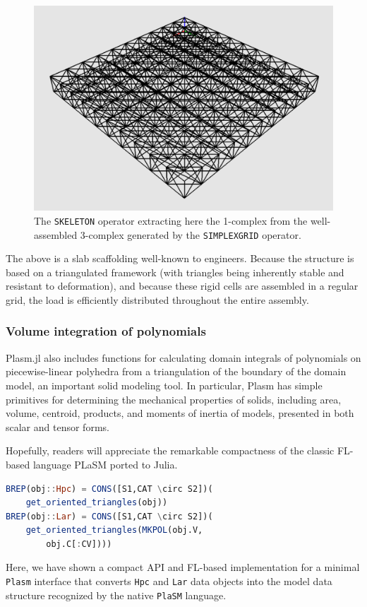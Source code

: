 \documentclass{juliacon}
\begin{document}
\begin{figure}[htbp] %
\includegraphics[width=\linewidth]{figs/3Dgrid}
\caption{ The {\tt SKELETON} operator extracting here the 1-complex from the well-assembled  3-complex generated by the {\tt SIMPLEXGRID} operator.}
\label{fig:multi-extrusion-02}
\end{figure}
The above is a slab scaffolding well-known to engineers. 
Because the structure is based on a triangulated framework (with triangles being inherently stable and resistant to deformation), and because these rigid cells are assembled in a regular grid, the load is efficiently distributed throughout the entire assembly. 

\subsubsection*{Volume integration of polynomials}
{Plasm.jl} also includes functions for calculating {domain integrals} of polynomials on piecewise-linear polyhedra \cite{CATTANI1990130} from a triangulation of the boundary of the domain model, an important solid modeling tool. In particular, Plasm has simple primitives for determining the mechanical properties of solids, including area, volume, centroid, products, and moments of inertia of models, presented in both scalar and tensor forms. 

Hopefully, readers will appreciate the remarkable compactness of the classic FL-based language PLaSM ported to Julia. 


\begin{lstlisting}[language = Julia,numbers=none,label={lst:exmpl10, mathescape = true},
caption={Boundary triangulation primitives.}
]
BREP(obj::Hpc) = CONS([S1,CAT \circ S2])(
	get_oriented_triangles(obj))
BREP(obj::Lar) = CONS([S1,CAT \circ S2])(
	get_oriented_triangles(MKPOL(obj.V,
		obj.C[:CV])))
\end{lstlisting}
Here, we have shown a compact API and FL-based implementation for a minimal  {\tt Plasm} interface that converts {\tt Hpc} and {\tt Lar} data objects into the model data structure recognized by the native {\tt PlaSM} language. 
\end{document}
